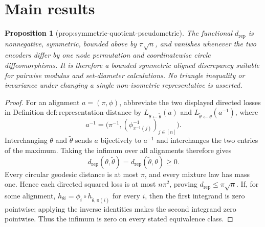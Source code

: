 \documentclass{article}
\newtheorem{proposition}{Proposition}
\begin{document}
\section{Main results}

\begin{proposition}[prop:symmetric-quotient-pseudometric]\label{prop:symmetric-quotient-pseudometric}
The functional \(d_{\mathrm{rep}}\) is nonnegative, symmetric, bounded above by \(\pi\sqrt n\), and vanishes whenever the two encoders differ by one node permutation and coordinatewise circle diffeomorphisms. It is therefore a bounded symmetric aligned discrepancy suitable for pairwise modulus and set-diameter calculations. No triangle inequality or invariance under changing a single non-isometric representative is asserted.
\end{proposition}
\begin{proof}
For an alignment \(a=(\pi,\phi)\), abbreviate the two displayed directed losses in Definition \(\mathrm{def:representation\text{-}distance}\) by \(L_{\theta\leftarrow\widetilde\theta}(a)\) and \(L_{\widetilde\theta\leftarrow\theta}(a^{-1})\), where
\[
 a^{-1}=\bigl(\pi^{-1},(\phi_{\pi^{-1}(j)}^{-1})_{j\in[n]}\bigr).
\]
Interchanging \(\theta\) and \(\widetilde\theta\) sends \(a\) bijectively to \(a^{-1}\) and interchanges the two entries of the maximum. Taking the infimum over all alignments therefore gives
\[
d_{\mathrm{rep}}(\theta,\widetilde\theta)
=d_{\mathrm{rep}}(\widetilde\theta,\theta)\ge0.
\]
Every circular geodesic distance is at most \(\pi\), and every mixture law has mass one. Hence each directed squared loss is at most \(n\pi^2\), proving \(d_{\mathrm{rep}}\le\pi\sqrt n\). If, for some alignment, \(h_{\theta i}=\phi_i\circ h_{\widetilde\theta,\pi(i)}\) for every \(i\), then the first integrand is zero pointwise; applying the inverse identities makes the second integrand zero pointwise. Thus the infimum is zero on every stated equivalence class.


\end{proof}
\end{document}
